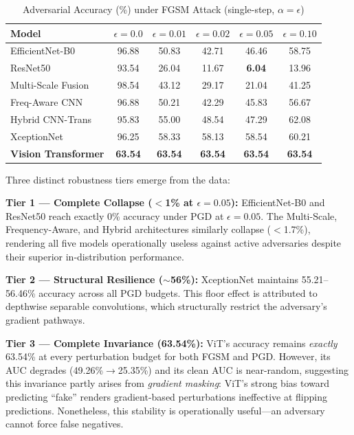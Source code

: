 \documentclass[runningheads]{llncs}
\begin{document}
\begin{table}[H]
\caption{Adversarial Accuracy (\%) under FGSM Attack (single-step, $\alpha{=}\epsilon$)}
\label{tab:adversarial_fgsm}
\centering
\small
\setlength{\tabcolsep}{5pt}
\begin{tabular}{lccccc}
\toprule
\textbf{Model} & $\epsilon{=}0.0$ & $\epsilon{=}0.01$ & $\epsilon{=}0.02$ & $\epsilon{=}0.05$ & $\epsilon{=}0.10$ \\
\midrule
EfficientNet-B0    & 96.88 & 50.83 & 42.71 & 46.46 & 58.75 \\
ResNet50           & 93.54 & 26.04 & 11.67 & \textbf{6.04} & 13.96 \\
Multi-Scale Fusion & 98.54 & 43.12 & 29.17 & 21.04 & 41.25 \\
Freq-Aware CNN     & 96.88 & 50.21 & 42.29 & 45.83 & 56.67 \\
Hybrid CNN-Trans   & 95.83 & 55.00 & 48.54 & 47.29 & 62.08 \\
\midrule
XceptionNet        & 96.25 & 58.33 & 58.13 & 58.54 & 60.21 \\
\textbf{Vision Transformer} & \textbf{63.54} & \textbf{63.54} & \textbf{63.54} & \textbf{63.54} & \textbf{63.54} \\
\bottomrule
\end{tabular}
\end{table}

Three distinct robustness tiers emerge from the data:

\textbf{Tier 1 --- Complete Collapse ($<$1\% at $\epsilon{=}0.05$):} EfficientNet-B0 and ResNet50 reach exactly 0\% accuracy under PGD at $\epsilon{=}0.05$. The Multi-Scale, Frequency-Aware, and Hybrid architectures similarly collapse ($<$1.7\%), rendering all five models operationally useless against active adversaries despite their superior in-distribution performance.

\textbf{Tier 2 --- Structural Resilience ($\sim$56\%):} XceptionNet maintains 55.21--56.46\% accuracy across all PGD budgets. This floor effect is attributed to depthwise separable convolutions, which structurally restrict the adversary's gradient pathways.

\textbf{Tier 3 --- Complete Invariance (63.54\%):} ViT's accuracy remains \textit{exactly} 63.54\% at every perturbation budget for both FGSM and PGD. However, its AUC degrades (49.26\%$\rightarrow$25.35\%) and its clean AUC is near-random, suggesting this invariance partly arises from \textit{gradient masking}: ViT's strong bias toward predicting ``fake'' renders gradient-based perturbations ineffective at flipping predictions. Nonetheless, this stability is operationally useful---an adversary cannot force false negatives.
\end{document}

